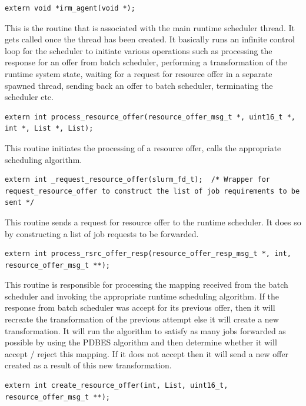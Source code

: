 \begin{lstlisting}[mathescape,frame=single]
extern void *irm_agent(void *);
\end{lstlisting}
This is the routine that is associated with the main runtime scheduler thread. It gets called once the thread has been created. It basically runs an infinite control loop for the scheduler to initiate various operations such as processing the response for an offer from batch scheduler, performing a transformation of the runtime system state, waiting for a request for resource offer in a separate spawned thread, sending back an offer to batch scheduler, terminating the scheduler etc.\\
\begin{lstlisting}[mathescape,frame=single]
extern int process_resource_offer(resource_offer_msg_t *, uint16_t *, int *, List *, List);
\end{lstlisting}
This routine initiates the processing of a resource offer, calls the appropriate scheduling algorithm.\\
\begin{lstlisting}[mathescape,frame=single]
extern int _request_resource_offer(slurm_fd_t);  /* Wrapper for request_resource_offer to construct the list of job requirements to be sent */
\end{lstlisting}
This routine sends a request for resource offer to the runtime scheduler. It does so by constructing a list of job requests to be forwarded.\\
\begin{lstlisting}[mathescape,frame=single]
extern int process_rsrc_offer_resp(resource_offer_resp_msg_t *, int, resource_offer_msg_t **);
\end{lstlisting}
This routine is responsible for processing the mapping received from the batch scheduler and invoking the appropriate runtime scheduling algorithm. If the response from batch scheduler was accept for its previous offer, then it will recreate the transformation of the previous attempt else it will create a new transformation. It will run the algorithm to satisfy as many jobs forwarded as possible by using the PDBES algorithm and then determine whether it will accept / reject this mapping. If it does not accept then it will send a new offer created as a result of this new transformation.\\
\begin{lstlisting}[mathescape,frame=single]
extern int create_resource_offer(int, List, uint16_t, resource_offer_msg_t **);
\end{lstlisting}
